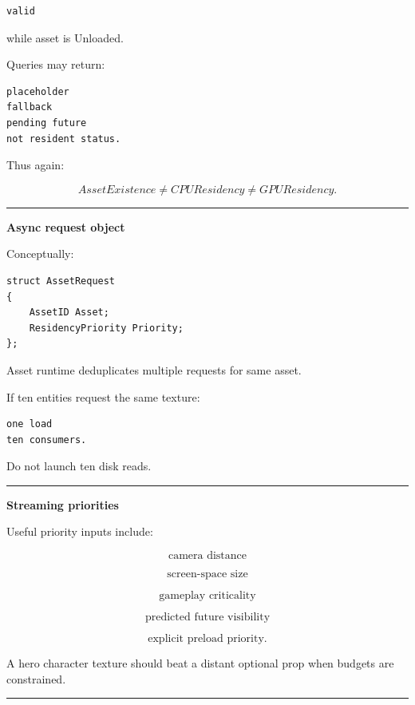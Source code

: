 \begin{verbatim}
valid
\end{verbatim}

while asset is Unloaded.

Queries may return:

\begin{verbatim}
placeholder
fallback
pending future
not resident status.
\end{verbatim}

Thus again:

\[
AssetExistence
\neq
CPUResidency
\neq
GPUResidency.
\]

\begin{center}\rule{0.5\linewidth}{0.5pt}\end{center}

\textbf{Async request object}

Conceptually:

\begin{verbatim}
struct AssetRequest
{
    AssetID Asset;
    ResidencyPriority Priority;
};
\end{verbatim}

Asset runtime deduplicates multiple requests for same asset.

If ten entities request the same texture:

\begin{verbatim}
one load
ten consumers.
\end{verbatim}

Do not launch ten disk reads.

\begin{center}\rule{0.5\linewidth}{0.5pt}\end{center}

\textbf{Streaming priorities}

Useful priority inputs include:

\[
\text{camera distance}
\]

\[
\text{screen-space size}
\]

\[
\text{gameplay criticality}
\]

\[
\text{predicted future visibility}
\]

\[
\text{explicit preload priority}.
\]

A hero character texture should beat a distant optional prop when budgets are constrained.

\begin{center}\rule{0.5\linewidth}{0.5pt}\end{center}

